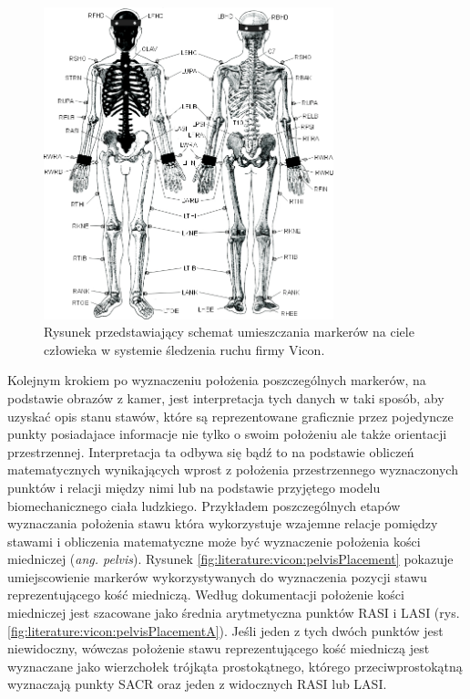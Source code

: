 \begin{figure}[!htp]
	\centering	
	\includegraphics[width=0.75\textwidth]{images/markerPlacement.jpg}
	\caption{Rysunek przedstawiający schemat umieszczania markerów na ciele człowieka w systemie śledzenia ruchu firmy Vicon\cite{ViconGaitPlacement}.}
	\label{fig:literature:vicon:markerPlacement}
\end{figure}
		
Kolejnym krokiem po wyznaczeniu położenia poszczególnych markerów, na podstawie obrazów z kamer, jest interpretacja tych danych w taki sposób, aby uzyskać opis stanu stawów, które są reprezentowane graficznie przez pojedyncze punkty posiadajace informacje nie tylko o swoim położeniu ale także orientacji przestrzennej. Interpretacja ta odbywa się bądź to na podstawie obliczeń matematycznych wynikających wprost z położenia przestrzennego wyznaczonych punktów i relacji między nimi lub na podstawie przyjętego modelu biomechanicznego ciała ludzkiego. 
Przykładem poszczególnych etapów wyznaczania położenia stawu która wykorzystuje wzajemne relacje pomiędzy stawami i obliczenia matematyczne może być wyznaczenie położenia kości miedniczej (\emph{ang. pelvis}). Rysunek \ref{fig:literature:vicon:pelvisPlacement} pokazuje umiejscowienie markerów wykorzystywanych do wyznaczenia pozycji stawu reprezentującego kość miedniczą. Według dokumentacji \cite{ViconModelingInstruction} położenie kości miedniczej jest szacowane jako średnia arytmetyczna punktów RASI i LASI (rys. \ref{fig:literature:vicon:pelvisPlacementA}). Jeśli jeden z tych dwóch punktów jest niewidoczny, wówczas położenie stawu reprezentującego kość miedniczą jest wyznaczane jako wierzchołek trójkąta prostokątnego, którego przeciwprostokątną wyznaczają punkty SACR oraz jeden z widocznych RASI lub LASI.
		
